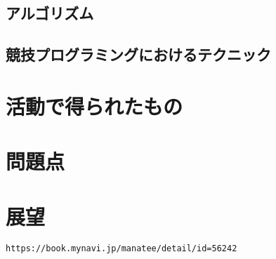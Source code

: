 \documentclass[11pt,a4paper]{jsarticle}
\begin{document}
\subsection{アルゴリズム}
\subsection{競技プログラミングにおけるテクニック}
\section{活動で得られたもの}
\section{問題点}
\section{展望}
\begin{thebibliography}
    \texttt{https://book.mynavi.jp/manatee/detail/id=56242}
\end{thebibliography}




%
%
\end{document}
